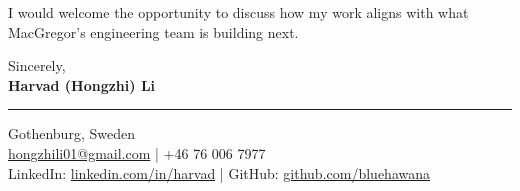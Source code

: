 \documentclass[a4paper,10pt]{article}
\begin{document}
I would welcome the opportunity to discuss how my work aligns with what MacGregor's engineering team is building next.

\vspace{15pt}

Sincerely,\\[15pt]
\textbf{Harvad (Hongzhi) Li}

\vspace{25pt}
{\color{linkedinblue}\rule{\linewidth}{0.6pt}}
\vspace{6pt}

{\color{linkedinblue}
  Gothenburg, Sweden\\
  \href{mailto:hongzhili01@gmail.com}{hongzhili01@gmail.com} | +46 76 006 7977\\
  LinkedIn: \href{https://www.linkedin.com/in/harvad/}{linkedin.com/in/harvad} |
  GitHub: \href{https://github.com/bluehawana}{github.com/bluehawana}
}
\end{document}
